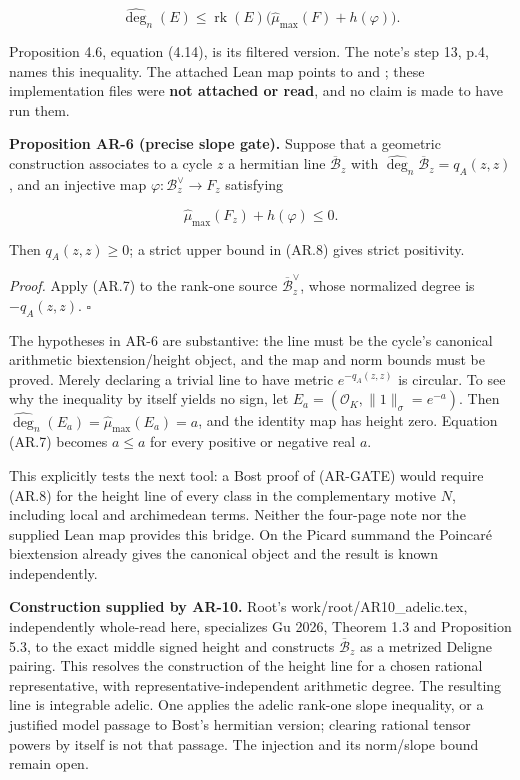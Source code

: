 \documentclass[11pt,a4paper]{article}
\begin{document}
\[
\widehat{\deg}_{n}(E)
\le\operatorname{rk}(E)\bigl(\widehat\mu_{\max}(F)+h(\varphi)\bigr).
\tag{AR.7}
\]

Proposition 4.6, equation (4.14), is its filtered version. The note's
step 13, p.4, names this inequality. The attached Lean map points to
and ; these
implementation files were \textbf{not attached or read}, and no claim is
made to have run them.

\textbf{Proposition AR-6 (precise slope gate).} Suppose that a geometric
construction associates to a cycle \(z\) a hermitian line
\(\overline{\mathcal B}_z\) with
\(\widehat{\deg}_n\overline{\mathcal B}_z=q_A(z,z)\), and an injective
map \(\varphi:\mathcal B_z^\vee\to F_z\) satisfying

\[
\widehat\mu_{\max}(F_z)+h(\varphi)\le0.
\tag{AR.8}
\]

Then \(q_A(z,z)\ge0\); a strict upper bound in (AR.8) gives strict
positivity.

\emph{Proof.} Apply (AR.7) to the rank-one source
\(\overline{\mathcal B}_z^\vee\), whose normalized degree is
\(-q_A(z,z)\). \(\square\)

The hypotheses in AR-6 are substantive: the line must be the cycle's
canonical arithmetic biextension/height object, and the map and norm
bounds must be proved. Merely declaring a trivial line to have metric
\(e^{-q_A(z,z)}\) is circular. To see why the inequality by itself
yields no sign, let \(E_a=(\mathcal O_K,\|1\|_\sigma=e^{-a})\). Then
\(\widehat{\deg}_n(E_a)=\widehat\mu_{\max}(E_a)=a\), and the identity
map has height zero. Equation (AR.7) becomes \(a\le a\) for every
positive or negative real \(a\).

This explicitly tests the next tool: a Bost proof of (AR-GATE) would
require (AR.8) for the height line of every class in the complementary
motive \(N\), including local and archimedean terms. Neither the
four-page note nor the supplied Lean map provides this bridge. On the
Picard summand the Poincaré biextension already gives the canonical
object and the result is known independently.

\textbf{Construction supplied by AR-10.} Root's
work/root/AR10\_adelic.tex, independently whole-read here, specializes
Gu 2026, Theorem 1.3 and Proposition 5.3, to the exact middle signed
height and constructs \(\overline{\mathcal B}_z\) as a metrized Deligne
pairing. This resolves the construction of the height line for a chosen
rational representative, with representative-independent arithmetic
degree. The resulting line is integrable adelic. One applies the adelic
rank-one slope inequality, or a justified model passage to Bost's
hermitian version; clearing rational tensor powers by itself is not that
passage. The injection and its norm/slope bound remain open.
\end{document}
